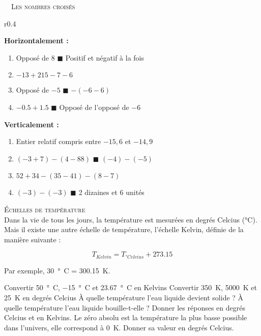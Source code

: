 \documentclass[../Cours.tex]{subfiles}
\begin{document}
\clearpage
\begin{questions}
    \exercice ~~\textsc{Les nombres croisés}\\
    \begin{wrapfigure}{r}{0.4\linewidth}
    \end{wrapfigure}
    \textbf{Horizontalement :}
    \begin{enumerate}
        \item Opposé de 8 $\blacksquare$ Positif et négatif à la fois
        \item $-13+215-7-6$
        \item Opposé de $-5$ $\blacksquare$ $-(-6-6)$
        \item $-0.5+1.5$ $\blacksquare$ Opposé de l'opposé de $-6$
    \end{enumerate}
    \textbf{Verticalement :}
    \begin{enumerate}
        \item Entier relatif compris entre $-15,6$ et $-14,9$
        \item $(-3+7) - (4-88)$ $\blacksquare$ $(-4) - (-5)$
        \item $52+34 - (35-41) - (8-7)$
        \item $(-3) - (-3)$ $\blacksquare$ 2 dizaines et 6 unités
    \end{enumerate}
    
    \exercice \textsc{Échelles de température}\\
    
    Dans la vie de tous les jours, la température est mesurées en degrés Celcius (°C). Mais il existe une autre échelle de température, l'échelle Kelvin, définie de la manière suivante :
    
    \[ T_{Kelvin} = T_{°Celcius} + \num{273,15} \]
    
    Par exemple, \qty{30}{°C} = \qty{300.15}{K}.
    
        \question Convertir \qty{50}{°C}, \qty{-15}{°C} et \qty{23,67}{°C} en Kelvins
        \question Convertir \qty{350}{K}, \qty{5000}{K} et \qty{25}{K} en degrés Celcius
        \question À quelle température l'eau liquide devient solide ? À quelle température l'eau liquide bouille-t-elle ? Donner les réponses en degrés Celcius et en Kelvins.
        \question Le zéro absolu est la température la plus basse possible dans l'univers, elle correspond à \qty{0}{K}. Donner sa valeur en degrés Celcius.
        

\end{questions}
\end{document}
